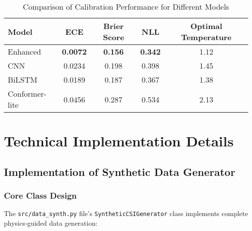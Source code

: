 \begin{table}[h]
\centering
\caption{Comparison of Calibration Performance for Different Models}
\label{tab:calibration_performance}
\begin{tabular}{@{}lcccc@{}}
\toprule
Model & ECE & Brier Score & NLL & Optimal Temperature \\
\midrule
Enhanced & \textbf{0.0072} & \textbf{0.156} & \textbf{0.342} & 1.12 \\
CNN & 0.0234 & 0.198 & 0.398 & 1.45 \\
BiLSTM & 0.0189 & 0.187 & 0.367 & 1.38 \\
Conformer-lite & 0.0456 & 0.287 & 0.534 & 2.13 \\
\bottomrule
\end{tabular}
\end{table}

\section{Technical Implementation Details}
\label{sec:technical_details}

\subsection{Implementation of Synthetic Data Generator}
\label{subsec:generator_implementation}

\subsubsection{Core Class Design}
The \texttt{src/data\_synth.py} file's \texttt{SyntheticCSIGenerator} class implements complete physics-guided data generation:

